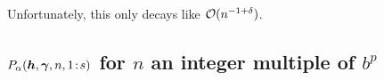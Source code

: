 \documentclass[authoryear]{elsarticle}
\newcommand{\tr}{\widetilde{r}}
\DeclareMathOperator{\appxint}{\hat{I}}
\newcommand{\onetos}{1\!:\!s}
\begin{document}
Unfortunately, this only decays like $\operatorname{{\mathcal O}}(n^{-1+\delta})$. \\


\subsection{$P_{\alpha}(\vh,\vgamma,n,\onetos)$ for $n$ an integer multiple of $b^p$}
\end{document}
